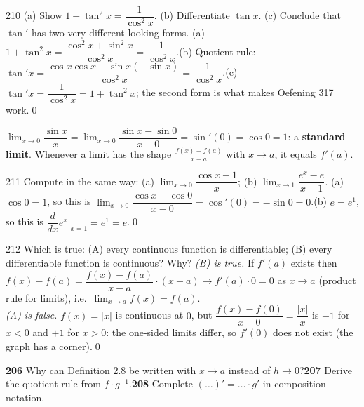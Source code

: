 \begin{bookex}{210}
(a) Show $1+\tan^2x=\dfrac1{\cos^2x}$. (b) Differentiate $\tan x$. (c) Conclude that $\tan'$ has two very different-looking forms.
\solution
(a) $1+\tan^2x=\dfrac{\cos^2x+\sin^2x}{\cos^2x}=\dfrac1{\cos^2x}$.\quad (b) Quotient rule: $\tan'x=\dfrac{\cos x\cos x-\sin x(-\sin x)}{\cos^2x}=\dfrac1{\cos^2x}$.\quad (c) $\tan'x=\dfrac1{\cos^2x}=1+\tan^2x$; the second form is what makes Oefening 317 work.\qed
\end{bookex}

\begin{strategy}
$\lim_{x\to0}\dfrac{\sin x}x=\lim_{x\to0}\dfrac{\sin x-\sin0}{x-0}=\sin'(0)=\cos0=1$: a \textbf{standard limit}. Whenever a limit has the shape $\frac{f(x)-f(a)}{x-a}$ with $x\to a$, it equals $f'(a)$.
\end{strategy}

\begin{bookex}{211}
Compute in the same way: (a) $\lim_{x\to0}\dfrac{\cos x-1}x$; (b) $\lim_{x\to1}\dfrac{e^x-e}{x-1}$.
\solution
(a) $\cos0=1$, so this is $\lim_{x\to0}\dfrac{\cos x-\cos0}{x-0}=\cos'(0)=-\sin0=0$.\quad (b) $e=e^1$, so this is $\dfrac d{dx}e^x\big|_{x=1}=e^1=e$.\qed
\end{bookex}

\begin{bookex}{212}
Which is true: (A) every continuous function is differentiable; (B) every differentiable function is continuous? Why?
\solution
\emph{(B) is true.} If $f'(a)$ exists then $f(x)-f(a)=\dfrac{f(x)-f(a)}{x-a}\cdot(x-a)\to f'(a)\cdot0=0$ as $x\to a$ (product rule for limits), i.e.\ $\lim_{x\to a}f(x)=f(a)$.\\
\emph{(A) is false.} $f(x)=|x|$ is continuous at $0$, but $\dfrac{f(x)-f(0)}{x-0}=\dfrac{|x|}x$ is $-1$ for $x<0$ and $+1$ for $x>0$: the one-sided limits differ, so $f'(0)$ does not exist (the graph has a corner).\qed
\end{bookex}

\begin{trybox}[{206, 207, 208}]
\textbf{206} Why can Definition 2.8 be written with $x\to a$ instead of $h\to0$?\quad \textbf{207} Derive the quotient rule from $f\cdot g^{-1}$.\quad \textbf{208} Complete $(\dots)'=\dots\cdot g'$ in composition notation.
\end{trybox}


